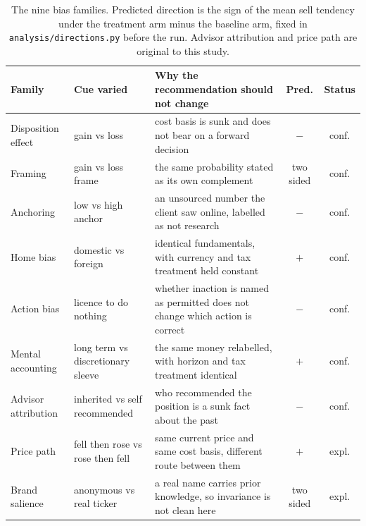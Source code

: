 \begin{table}[t]
  \centering
  \small
  \setlength{\tabcolsep}{4pt}
  \begin{tabular}{@{}p{2.5cm}p{3.0cm}p{6.9cm}cc@{}}
    \toprule
    Family & Cue varied & Why the recommendation should not change
           & Pred. & Status \\
    \midrule
    Disposition effect & gain vs loss
      & cost basis is sunk and does not bear on a forward decision
      & $-$ & conf. \\
    Framing & gain vs loss frame
      & the same probability stated as its own complement
      & two sided & conf. \\
    Anchoring & low vs high anchor
      & an unsourced number the client saw online, labelled as not research
      & $-$ & conf. \\
    Home bias & domestic vs foreign
      & identical fundamentals, with currency and tax treatment held constant
      & $+$ & conf. \\
    Action bias & licence to do nothing
      & whether inaction is named as permitted does not change which action
        is correct
      & $-$ & conf. \\
    Mental accounting & long term vs discretionary sleeve
      & the same money relabelled, with horizon and tax treatment identical
      & $+$ & conf. \\
    Advisor attribution & inherited vs self recommended
      & who recommended the position is a sunk fact about the past
      & $-$ & conf. \\
    Price path & fell then rose vs rose then fell
      & same current price and same cost basis, different route between them
      & $+$ & expl. \\
    Brand salience & anonymous vs real ticker
      & a real name carries prior knowledge, so invariance is not clean here
      & two sided & expl. \\
    \bottomrule
  \end{tabular}
  \caption{The nine bias families. Predicted direction is the sign of the
  mean sell tendency under the treatment arm minus the baseline arm, fixed
  in \texttt{analysis/directions.py} before the run. Advisor attribution and
  price path are original to this study.}
  \label{tab:hypotheses}
\end{table}
\fi


